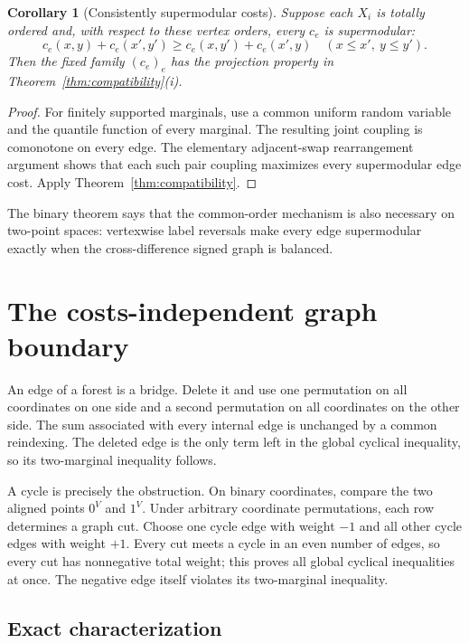 \documentclass[11pt]{article}
\newtheorem{corollary}[theorem]{Corollary}
\newcommand{\1}{\mathbf 1}
\begin{document}
\begin{corollary}[Consistently supermodular costs]\label{cor:supermodular}
Suppose each $X_i$ is totally ordered and, with respect to these vertex
orders, every $c_e$ is supermodular:
\[
 c_e(x,y)+c_e(x',y')\geq c_e(x,y')+c_e(x',y)
 \quad(x\leq x',\ y\leq y').
\]
Then the fixed family $(c_e)_e$ has the projection property in
Theorem~\ref{thm:compatibility}(i).
\end{corollary}

\begin{proof}
For finitely supported marginals, use a common uniform random variable and
the quantile function of every marginal.  The resulting joint coupling is
comonotone on every edge.  The elementary adjacent-swap rearrangement
argument shows that each such pair coupling maximizes every supermodular
edge cost.  Apply Theorem~\ref{thm:compatibility}.
\end{proof}

The binary theorem says that the common-order mechanism is also necessary
on two-point spaces: vertexwise label reversals make every edge
supermodular exactly when the cross-difference signed graph is balanced.

\section{The costs-independent graph boundary}

An edge of a forest is a bridge.  Delete it and use one permutation on all
coordinates on one side and a second permutation on all coordinates on the
other side.  The sum associated with every internal edge is unchanged by a
common reindexing.  The deleted edge is the only term left in the global
cyclical inequality, so its two-marginal inequality follows.

A cycle is precisely the obstruction.  On binary coordinates, compare the
two aligned points $0^V$ and $1^V$.  Under arbitrary coordinate
permutations, each row determines a graph cut.  Choose one cycle edge with
weight $-1$ and all other cycle edges with weight $+1$.  Every cut meets a
cycle in an even number of edges, so every cut has nonnegative total weight;
this proves all global cyclical inequalities at once.  The negative edge
itself violates its two-marginal inequality.

\subsection{Exact characterization}
\end{document}
